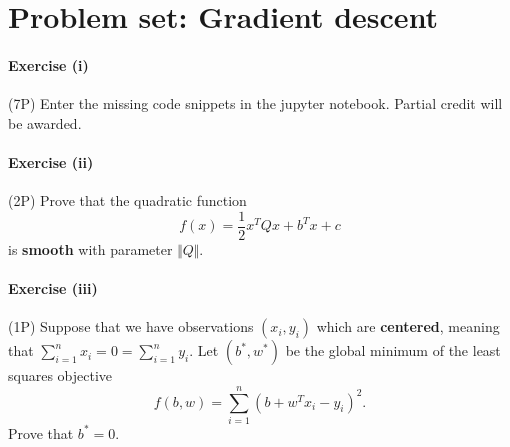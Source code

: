 \documentclass{scrartcl}
\theoremstyle{definition}
\begin{document}
\section{Problem set: Gradient descent}%

\paragraph{Exercise (i)} (7P) Enter the missing code snippets in the jupyter notebook. Partial credit will be awarded.

\paragraph{Exercise (ii)} (2P) Prove that the quadratic function
\begin{equation}
  f(x) = \frac{1}{2} x^T Q x +b^T x + c
\end{equation}
is \textbf{smooth} with parameter $\Vert Q \Vert$.


\paragraph{Exercise (iii)} (1P) Suppose that we have observations $(x_i, y_i)$ which are \textbf{centered}, meaning that $\sum_{i=1}^{n}x_i = 0 = \sum_{i=1}^{n}y_i$. Let $(b^*, w^*)$ be the global minimum of the least squares objective
\begin{equation}
  f(b, w) = \sum_{i=1}^{n} {(b + w^T x_i - y_i)}^2.
\end{equation}
Prove that $b^*=0$.
\end{document}
